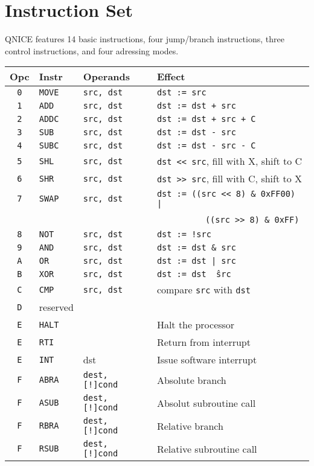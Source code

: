 \documentclass{leaflet}
\begin{document}
 \section{Instruction Set}
  QNICE features 14 basic instructions, four jump/branch instructions, three
  control instructions, and four adressing modes.
  \vspace*{-3mm}
  {\scriptsize
   \begin{center}
    \begin{longtable}{|c|ll|l|}
     \hline
      Opc&Instr&Operands&Effect\\
     \hline
     \hline
      {\tt 0}&{\tt MOVE}&{\tt src, dst}&{\tt dst := src}\\
      {\tt 1}&{\tt ADD}&{\tt src, dst}&{\tt dst := dst + src}\\
      {\tt 2}&{\tt ADDC}&{\tt src, dst}&{\tt dst := dst + src + C}\\
      {\tt 3}&{\tt SUB}&{\tt src, dst}&{\tt dst := dst - src}\\
      {\tt 4}&{\tt SUBC}&{\tt src, dst}&{\tt dst := dst - src - C}\\
      {\tt 5}&{\tt SHL}&{\tt src, dst}&{\tt dst << src}, fill with X, shift to C\\
      {\tt 6}&{\tt SHR}&{\tt src, dst}&{\tt dst >> src}, fill with C, shift to X\\
      {\tt 7}&{\tt SWAP}&{\tt src, dst}&{\tt dst := ((src << 8) \& 0xFF00) |}\\
             &          &              &~~~~~~~~~~{\tt ((src >> 8) \& 0xFF)}\\
      {\tt 8}&{\tt NOT}&{\tt src, dst}&{\tt dst := !src}\\
      {\tt 9}&{\tt AND}&{\tt src, dst}&{\tt dst := dst \& src}\\
      {\tt A}&{\tt OR}&{\tt src, dst}&{\tt dst := dst | src}\\
      {\tt B}&{\tt XOR}&{\tt src, dst}&{\tt dst := dst \^\ src}\\
      {\tt C}&{\tt CMP}&{\tt src, dst}&compare {\tt src} with {\tt dst}\\
      {\tt D}&reserved&&\\
      {\tt E}&{\tt HALT}&&Halt the processor\\
      {\tt E}&{\tt RTI}&&Return from interrupt\\
      {\tt E}&{\tt INT}&dst&Issue software interrupt\\
      {\tt F}&{\tt ABRA}&{\tt dest, [!]cond}&Absolute branch\\
      {\tt F}&{\tt ASUB}&{\tt dest, [!]cond}&Absolut subroutine call\\
      {\tt F}&{\tt RBRA}&{\tt dest, [!]cond}&Relative branch\\
      {\tt F}&{\tt RSUB}&{\tt dest, [!]cond}&Relative subroutine call\\
     \hline
    \end{longtable}
   \end{center}
  }
%
\end{document}

